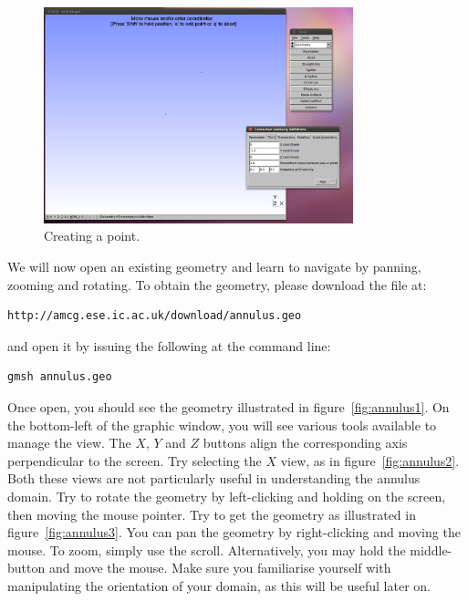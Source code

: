 \begin{figure}[htbp]
 \centering
  \includegraphics[width=0.8\textwidth]{../figures/shot5.png}
  \caption{Creating a point.}
  \label{fig:creating_a_point}
\end{figure}

We will now open an existing geometry and learn to navigate by panning, zooming and rotating. To obtain the geometry, please download the file at:
\begin{lstlisting}
http://amcg.ese.ic.ac.uk/download/annulus.geo
\end{lstlisting}
and open it by issuing the following at the command line:
\begin{lstlisting}
gmsh annulus.geo
\end{lstlisting}

Once open, you should see the geometry illustrated in figure~\ref{fig:annulus1}. On the bottom-left of the graphic window,
you will see various tools available to manage the view.
The $X$, $Y$ and $Z$ buttons align the corresponding axis perpendicular to the screen. Try selecting the
$X$ view, as in figure~\ref{fig:annulus2}. Both these views are not particularly useful in understanding
the annulus domain. Try to rotate the geometry by left-clicking and holding on the screen, then moving the mouse pointer.
Try to get the geometry as illustrated in figure~\ref{fig:annulus3}. You can pan the geometry by right-clicking and moving the mouse. To zoom, simply use the scroll. Alternatively, you may hold the middle-button and move the mouse. Make sure you familiarise yourself with manipulating the orientation of your domain, as this will be useful later on.


